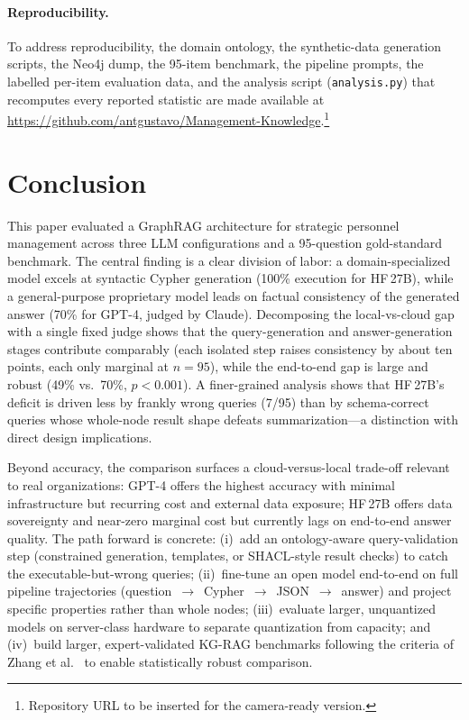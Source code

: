 \documentclass{ceurart}
\begin{document}
\paragraph{Reproducibility.}
To address reproducibility, the domain ontology, the synthetic-data generation
scripts, the Neo4j dump, the 95-item benchmark, the pipeline prompts, the labelled
per-item evaluation data, and the analysis script (\texttt{analysis.py}) that
recomputes every reported statistic are made available at
\url{https://github.com/antgustavo/Management-Knowledge}.\footnote{Repository URL to be
inserted for the camera-ready version.}

\section{Conclusion}

This paper evaluated a GraphRAG architecture for strategic personnel management
across three LLM configurations and a 95-question gold-standard benchmark. The
central finding is a clear division of labor: a domain-specialized model excels at
syntactic Cypher generation (100\% execution for HF\,27B), while a general-purpose
proprietary model leads on factual consistency of the generated answer (70\% for
GPT-4, judged by Claude). Decomposing the local-vs-cloud gap with a single fixed
judge shows that the query-generation and answer-generation stages contribute
comparably (each isolated step raises consistency by about ten points, each only
marginal at $n=95$), while the end-to-end gap is large and robust (49\% vs.\ 70\%,
$p<0.001$). A finer-grained analysis shows that HF\,27B's deficit is driven less by
frankly wrong queries (7/95) than by schema-correct queries whose whole-node result
shape defeats summarization---a distinction with direct design implications.

Beyond accuracy, the comparison surfaces a cloud-versus-local trade-off relevant to
real organizations: GPT-4 offers the highest accuracy with minimal infrastructure
but recurring cost and external data exposure; HF\,27B offers data sovereignty and
near-zero marginal cost but currently lags on end-to-end answer quality. The path
forward is concrete: (i)~add an ontology-aware query-validation step
(constrained generation, templates, or SHACL-style result checks) to catch the
executable-but-wrong queries; (ii)~fine-tune an open model end-to-end on full
pipeline trajectories (question~$\rightarrow$~Cypher~$\rightarrow$~JSON~$\rightarrow$~answer)
and project specific properties rather than whole nodes; (iii)~evaluate larger,
unquantized models on server-class hardware to separate quantization from capacity;
and (iv)~build larger, expert-validated KG-RAG benchmarks following the criteria of
Zhang et al.~\cite{zhang2025diagnosingaddressingpitfallskgrag} to enable
statistically robust comparison.
\end{document}
